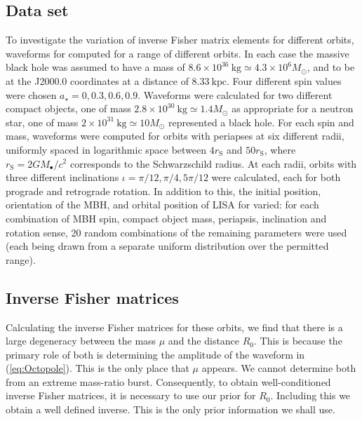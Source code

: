 \documentclass[useAMS,usedcolumn,usegraphicx,usenatbib]{mn2e}
\newcommand{\eqnref}[1]{(\ref{eq:#1})}
\newcommand{\sub}[1]{\ensuremath{_\mathrm{#1}}}
\begin{document}
\subsection{Data set}

To investigate the variation of inverse Fisher matrix elements for different orbits, waveforms for computed for a range of different orbits. In each case the massive black hole was assumed to have a mass of $8.6 \times 10^{36}~\mathrm{kg} \simeq 4.3 \times 10^6 M_\odot$, and to be at the J2000.0 coordinates at a distance of $8.33~\mathrm{kpc}$. Four different spin values were chosen $a_\star = 0, 0.3, 0.6, 0.9$. Waveforms were calculated for two different compact objects, one of mass $2.8 \times 10^{30}~\mathrm{kg} \simeq 1.4 M_\odot$ as appropriate for a neutron star, one of mass $2 \times 10^{31}~\mathrm{kg} \simeq 10 M_\odot$ represented a black hole. For each spin and mass, waveforms were computed for orbits with periapses at six different radii, uniformly spaced in logarithmic space between $4 r\sub{S}$ and $50 r\sub{S}$, where $r\sub{S} = 2 GM_\bullet / c^2$ corresponds to the Schwarzschild radius. At each radii, orbits with three different inclinations $\iota = \pi/12, \pi/4, 5\pi/12$ were calculated, each for both prograde and retrograde rotation. In addition to this, the initial position, orientation of the MBH, and orbital position of LISA for varied: for each combination of MBH spin, compact object mass, periapsis, inclination and rotation sense, 20 random combinations of the remaining parameters were used (each being drawn from a separate uniform distribution over the permitted range).

\subsection{Inverse Fisher matrices}

Calculating the inverse Fisher matrices for these orbits, we find that there is a large degeneracy between the mass $\mu$ and the distance $R_0$. This is because the primary role of both is determining the amplitude of the waveform in \eqnref{Octopole}. This is the only place that $\mu$ appears. We cannot determine both from an extreme mass-ratio burst. Consequently, to obtain well-conditioned inverse Fisher matrices, it is necessary to use our prior for $R_0$. Including this we obtain a well defined inverse. This is the only prior information we shall use.
\end{document}
